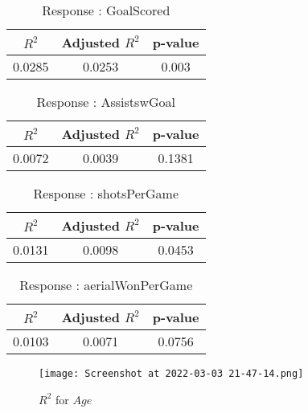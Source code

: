 \documentclass[12pt]{article}
\begin{document}
\begin{minipage}{0.5\textwidth}
	\begin{table}[H]
	\centering
	\caption{Response : GoalScored}\label{table:1a}
	{\begin{tabular}{|c|c|c|}
			\hline
			$ R^2 $ & Adjusted $ R^2 $ & p-value \\
			\hline
			0.0285 & 0.0253 & 0.003 \\
			\hline
		\end{tabular}
	}
\end{table}
\begin{table}[H]
	\centering
	\caption{Response : AssistswGoal}\label{table:1a}
	{\begin{tabular}{|c|c|c|}
			\hline
			$ R^2 $ & Adjusted $ R^2 $ & p-value \\
			\hline
			0.0072 & 0.0039 & 0.1381 \\
			\hline
		\end{tabular}
	}
\end{table}
\end{minipage}
\hfill
\begin{minipage}{0.5\textwidth}
	\begin{table}[H]
	\centering
	\caption{Response : shotsPerGame }\label{table:1a}
	{\begin{tabular}{|c|c|c|}
			\hline
			$ R^2 $ & Adjusted $ R^2 $ & p-value \\
			\hline
			0.0131 & 0.0098 & 0.0453 \\
			\hline
		\end{tabular}
	}
\end{table}
\begin{table}[H]
	\centering
	\caption{Response : aerialWonPerGame}\label{table:1a}
	{\begin{tabular}{|c|c|c|}
			\hline
			$ R^2 $ & Adjusted $ R^2 $ & p-value \\
			\hline
			0.0103 & 0.0071 & 0.0756 \\
			\hline
		\end{tabular}
	}
\end{table}	
\end{minipage}
	
\begin{figure}[H]
	\centering
	\texttt{[image: Screenshot at 2022-03-03 21-47-14.png]}
	\caption{$ R^2 $ for $ Age $}
	\label{fig:1}
\end{figure}
\end{document}
